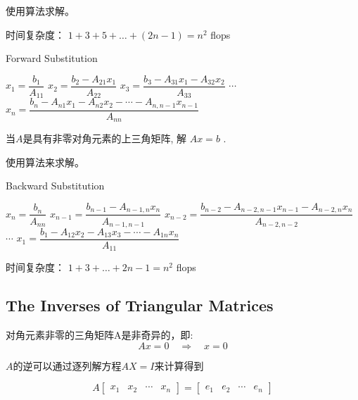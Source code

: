 使用算法求解。

时间复杂度： $ 1+3+5+\ldots+(2  {n}-1)= {n}^{2} $ flops

\begin{algorithm}[htbp]
    \caption{Forward Substitution}
    $ x_{1}= \dfrac{b_{1} }{A_{11} }  $\;
$ x_{2}=\dfrac{b_{2}-A_{21} x_{1}}{A_{22}}$\;
$  x_{3} =\dfrac{b_{3}-A_{31} x_{1}-A_{32} x_{2}}{A_{33}} $ \;
    $\cdots$  \;
    $x_{n} =
    \dfrac{b_{n}-A_{n 1} x_{1}-A_{n 2} x_{2}-\cdots-A_{n, n-1} x_{n-1}}{A_{n n}} $\;
\end{algorithm}

\begin{problem}
    当$A$是具有非零对角元素的上三角矩阵, 解 $  {A} x= {b} $ .
\end{problem}

使用算法来求解。

\begin{algorithm}[htbp]
    \caption{Backward Substitution}
    $ x_{n}= \dfrac{b_{n}}{A_{n n}} $\;
    $ x_{n-1}= \dfrac{b_{n-1}-A_{n-1, n} x_{n}}{A_{n-1, n-1}} $ \;
    $ x_{n-2}= \dfrac{b_{n-2}-A_{n-2, n-1} x_{n-1}-A_{n-2, n} x_{n}}{ A_{n-2, n-2}} $\;
    $\cdots$\;
    $ x_{1}=\dfrac{b_{1}-A_{12} x_{2}-A_{13} x_{3}-\cdots-A_{1 n} x_{n}}{A_{11}}  $\;
\end{algorithm}

时间复杂度： $ 1+3+\ldots+2  {n}-1= {n}^{2} $ flops

\subsection{The Inverses of Triangular Matrices}

\begin{theorem}
    对角元素非零的三角矩阵A是非奇异的，即:
$$
A x=0 \quad \Rightarrow \quad x=0
$$
\end{theorem}

\begin{theorem}[高斯消元法]
    $A$的逆可以通过逐列解方程$AX=I$来计算得到

    $$ A\left[\begin{array}{llll}x_{1} & x_{2} & \cdots & x_{n}\end{array}\right]=\left[\begin{array}{llll}e_{1} & e_{2} & \cdots & e_{n}\end{array}\right] $$
\end{theorem}

